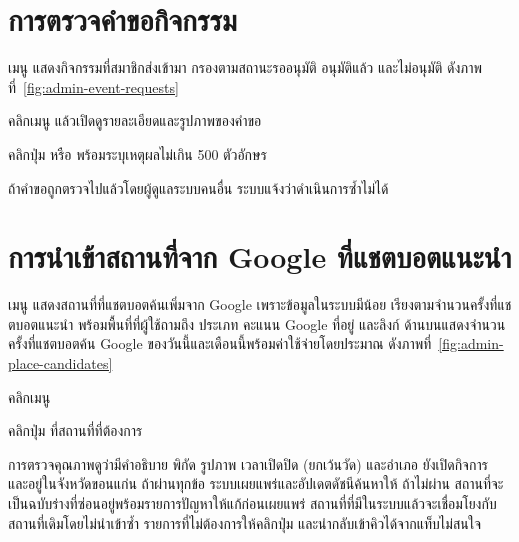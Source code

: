 \section{การตรวจคำขอกิจกรรม}
\label{sec:admin-event-requests}

เมนู  แสดงกิจกรรมที่สมาชิกส่งเข้ามา กรองตามสถานะรออนุมัติ อนุมัติแล้ว และไม่อนุมัติ ดังภาพที่~\ref{fig:admin-event-requests}


\begin{steps}
  \item คลิกเมนู  แล้วเปิดดูรายละเอียดและรูปภาพของคำขอ
  \item คลิกปุ่ม  หรือ  พร้อมระบุเหตุผลไม่เกิน 500 ตัวอักษร
\end{steps}

ถ้าคำขอถูกตรวจไปแล้วโดยผู้ดูแลระบบคนอื่น ระบบแจ้งว่าดำเนินการซ้ำไม่ได้

\section{การนำเข้าสถานที่จาก Google ที่แชตบอตแนะนำ}

เมนู  แสดงสถานที่ที่แชตบอตค้นเพิ่มจาก Google เพราะข้อมูลในระบบมีน้อย เรียงตามจำนวนครั้งที่แชตบอตแนะนำ พร้อมพื้นที่ที่ผู้ใช้ถามถึง ประเภท คะแนน Google ที่อยู่ และลิงก์  ด้านบนแสดงจำนวนครั้งที่แชตบอตค้น Google ของวันนี้และเดือนนี้พร้อมค่าใช้จ่ายโดยประมาณ ดังภาพที่~\ref{fig:admin-place-candidates}


\begin{steps}
  \item คลิกเมนู 
  \item คลิกปุ่ม  ที่สถานที่ที่ต้องการ
\end{steps}

การตรวจคุณภาพดูว่ามีคำอธิบาย พิกัด รูปภาพ เวลาเปิดปิด (ยกเว้นวัด) และอำเภอ ยังเปิดกิจการ และอยู่ในจังหวัดขอนแก่น ถ้าผ่านทุกข้อ ระบบเผยแพร่และอัปเดตดัชนีค้นหาให้ ถ้าไม่ผ่าน สถานที่จะเป็นฉบับร่างที่ซ่อนอยู่พร้อมรายการปัญหาให้แก้ก่อนเผยแพร่ สถานที่ที่มีในระบบแล้วจะเชื่อมโยงกับสถานที่เดิมโดยไม่นำเข้าซ้ำ รายการที่ไม่ต้องการให้คลิกปุ่ม  และนำกลับเข้าคิวได้จากแท็บไม่สนใจ

